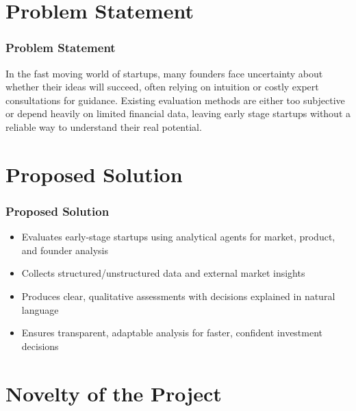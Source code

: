 \documentclass{beamer}
\begin{document}
\section{Problem Statement}

\begin{frame}
\frametitle{Problem Statement}
In the fast moving world of startups, many founders face uncertainty about whether their ideas will succeed, often relying on intuition or costly expert consultations for guidance. Existing evaluation methods are either too subjective or depend heavily on limited financial data, leaving early stage startups without a reliable way to understand their real potential.


\end{frame}

\section{Proposed Solution}

\begin{frame}
\frametitle{Proposed Solution}
\begin{itemize}
    \item Evaluates early-stage startups using analytical agents for market, product, and founder analysis
    \item Collects structured/unstructured data and external market insights
    \item Produces clear, qualitative assessments with decisions explained in natural language
    \item Ensures transparent, adaptable analysis for faster, confident investment decisions
\end{itemize}
\end{frame}

\section{Novelty of the Project}
\end{document}
